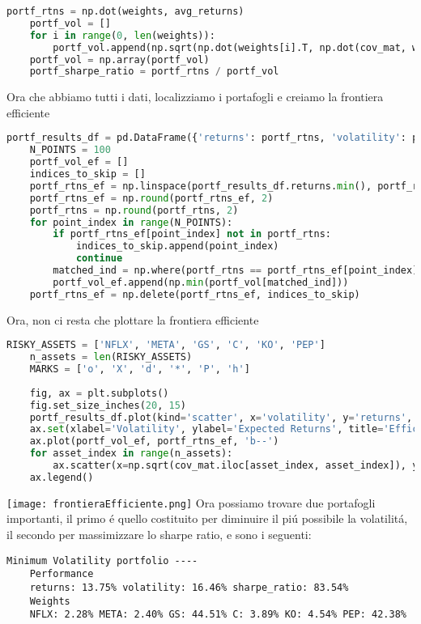 \documentclass{report}
\begin{document}
\begin{lstlisting}[language=python]
    portf_rtns = np.dot(weights, avg_returns)
    portf_vol = []
    for i in range(0, len(weights)):
        portf_vol.append(np.sqrt(np.dot(weights[i].T, np.dot(cov_mat, weights[i]))))
    portf_vol = np.array(portf_vol)
    portf_sharpe_ratio = portf_rtns / portf_vol
\end{lstlisting}
Ora che abbiamo tutti i dati, localizziamo i portafogli e creiamo la frontiera efficiente
\begin{lstlisting}[language=python]
    portf_results_df = pd.DataFrame({'returns': portf_rtns, 'volatility': portf_vol, 'sharpe_ratio': portf_sharpe_ratio})
    N_POINTS = 100
    portf_vol_ef = []
    indices_to_skip = []
    portf_rtns_ef = np.linspace(portf_results_df.returns.min(), portf_results_df.returns.max(), N_POINTS)
    portf_rtns_ef = np.round(portf_rtns_ef, 2)
    portf_rtns = np.round(portf_rtns, 2)
    for point_index in range(N_POINTS):
        if portf_rtns_ef[point_index] not in portf_rtns:
            indices_to_skip.append(point_index)
            continue
        matched_ind = np.where(portf_rtns == portf_rtns_ef[point_index])
        portf_vol_ef.append(np.min(portf_vol[matched_ind]))
    portf_rtns_ef = np.delete(portf_rtns_ef, indices_to_skip)
\end{lstlisting}
Ora, non ci resta che plottare la frontiera efficiente
\begin{lstlisting}[language=python]
    RISKY_ASSETS = ['NFLX', 'META', 'GS', 'C', 'KO', 'PEP']
    n_assets = len(RISKY_ASSETS)
    MARKS = ['o', 'X', 'd', '*', 'P', 'h']
    
    fig, ax = plt.subplots()
    fig.set_size_inches(20, 15)
    portf_results_df.plot(kind='scatter', x='volatility', y='returns', c='sharpe_ratio', cmap='RdYlGn', edgecolors='black', ax=ax)
    ax.set(xlabel='Volatility', ylabel='Expected Returns', title='Efficient Frontier')
    ax.plot(portf_vol_ef, portf_rtns_ef, 'b--')
    for asset_index in range(n_assets):
        ax.scatter(x=np.sqrt(cov_mat.iloc[asset_index, asset_index]), y=avg_returns[asset_index], marker=MARKS[asset_index], s=150, color='black', label=RISKY_ASSETS[asset_index])
    ax.legend()
\end{lstlisting}
\texttt{[image: frontieraEfficiente.png]}
Ora possiamo trovare due portafogli importanti, il primo é quello costituito per diminuire il piú possibile la volatilitá, il secondo per massimizzare lo sharpe ratio, e sono i seguenti:
\begin{lstlisting}[]
    Minimum Volatility portfolio ----
    Performance
    returns: 13.75% volatility: 16.46% sharpe_ratio: 83.54% 
    Weights
    NFLX: 2.28% META: 2.40% GS: 44.51% C: 3.89% KO: 4.54% PEP: 42.38%
\end{lstlisting}
\end{document}
